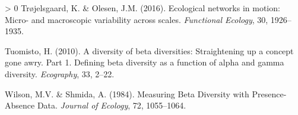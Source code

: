 \documentclass[10pt,oneside]{article}
\newlength{\cslhangindent}
\newenvironment{CSLReferences}[3] %
 {%
  \setlength{\parindent}{0pt}
  \ifodd #1 \everypar{\setlength{\hangindent}{\cslhangindent}}\ignorespaces\fi
  \ifnum #2 > 0
  \setlength{\parskip}{#2\baselineskip}
  \fi
 }%
 {}
\begin{document}
\begin{CSLReferences}{1}{0}
\leavevmode\hypertarget{ref-Trojelsgaard2016EcoNet}{}%
Trøjelsgaard, K. \& Olesen, J.M. (2016). Ecological networks in motion:
Micro- and macroscopic variability across scales. \emph{Functional
Ecology}, 30, 1926--1935.

\leavevmode\hypertarget{ref-Tuomisto2010DivBet}{}%
Tuomisto, H. (2010). A diversity of beta diversities: Straightening up a
concept gone awry. Part 1. Defining beta diversity as a function of
alpha and gamma diversity. \emph{Ecography}, 33, 2--22.

\leavevmode\hypertarget{ref-Wilson1984MeaBet}{}%
Wilson, M.V. \& Shmida, A. (1984). Measuring Beta Diversity with
Presence-Absence Data. \emph{Journal of Ecology}, 72, 1055--1064.

\end{CSLReferences}
\end{document}
